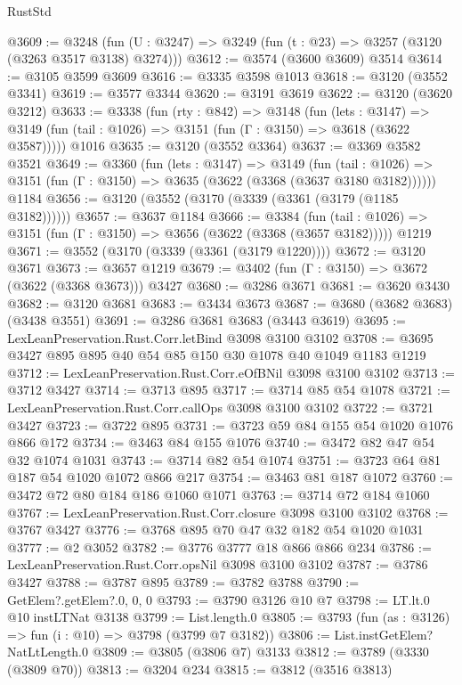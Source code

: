\begin{lexlean}{RustStd}
\begin{coremodule}
{\begin{coremodule}
{{{{{{{{{{{{{{{{{{{{{{{{{{@3609 := @3248 (fun (U : @3247) => @3249 (fun (t : @23) => @3257 (@3120 (@3263 @3517 @3138) @3274)))
@3612 := @3574 (@3600 @3609) @3514
@3614 := @3105 @3599 @3609
@3616 := @3335 @3598 @1013
@3618 := @3120 (@3552 @3341)
@3619 := @3577 @3344
@3620 := @3191 @3619
@3622 := @3120 (@3620 @3212)
@3633 := @3338
    (fun (rty : @842) =>
    @3148
      (fun (lets : @3147) =>
      @3149 (fun (tail : @1026) => @3151 (fun (Γ : @3150) => @3618 (@3622 @3587)))))
    @1016
@3635 := @3120 (@3552 @3364)
@3637 := @3369 @3582 @3521
@3649 := @3360
    (fun (lets : @3147) =>
    @3149
      (fun (tail : @1026) => @3151 (fun (Γ : @3150) => @3635 (@3622 (@3368 (@3637 @3180 @3182))))))
    @1184
@3656 := @3120 (@3552 (@3170 (@3339 (@3361 (@3179 (@1185 @3182))))))
@3657 := @3637 @1184
@3666 := @3384
    (fun (tail : @1026) => @3151 (fun (Γ : @3150) => @3656 (@3622 (@3368 (@3657 @3182)))))
    @1219
@3671 := @3552 (@3170 (@3339 (@3361 (@3179 @1220))))
@3672 := @3120 @3671
@3673 := @3657 @1219
@3679 := @3402 (fun (Γ : @3150) => @3672 (@3622 (@3368 @3673))) @3427
@3680 := @3286 @3671
@3681 := @3620 @3430
@3682 := @3120 @3681
@3683 := @3434 @3673
@3687 := @3680 (@3682 @3683) (@3438 @3551)
@3691 := @3286 @3681 @3683 (@3443 @3619)
@3695 := LexLeanPreservation.Rust.Corr.letBind @3098 @3100 @3102
@3708 := @3695 @3427 @895 @895 @40 @54 @85 @150 @30 @1078 @40 @1049 @1183 @1219
@3712 := LexLeanPreservation.Rust.Corr.eOfBNil @3098 @3100 @3102
@3713 := @3712 @3427
@3714 := @3713 @895
@3717 := @3714 @85 @54 @1078
@3721 := LexLeanPreservation.Rust.Corr.callOps @3098 @3100 @3102
@3722 := @3721 @3427
@3723 := @3722 @895
@3731 := @3723 @59 @84 @155 @54 @1020 @1076 @866 @172
@3734 := @3463 @84 @155 @1076
@3740 := @3472 @82 @47 @54 @32 @1074 @1031
@3743 := @3714 @82 @54 @1074
@3751 := @3723 @64 @81 @187 @54 @1020 @1072 @866 @217
@3754 := @3463 @81 @187 @1072
@3760 := @3472 @72 @80 @184 @186 @1060 @1071
@3763 := @3714 @72 @184 @1060
@3767 := LexLeanPreservation.Rust.Corr.closure @3098 @3100 @3102
@3768 := @3767 @3427
@3776 := @3768 @895 @70 @47 @32 @182 @54 @1020 @1031
@3777 := @2 @3052
@3782 := @3776 @3777 @18 @866 @866 @234
@3786 := LexLeanPreservation.Rust.Corr.opsNil @3098 @3100 @3102
@3787 := @3786 @3427
@3788 := @3787 @895
@3789 := @3782 @3788
@3790 := GetElem?.getElem?.{0, 0, 0}
@3793 := @3790 @3126 @10 @7
@3798 := LT.lt.{0} @10 instLTNat @3138
@3799 := List.length.{0}
@3805 := @3793 (fun (as : @3126) => fun (i : @10) => @3798 (@3799 @7 @3182))
@3806 := List.instGetElem?NatLtLength.{0}
@3809 := @3805 (@3806 @7) @3133
@3812 := @3789 (@3330 (@3809 @70))
@3813 := @3204 @234
@3815 := @3812 (@3516 @3813)
}}}}}}}}}}}}}}}}}}}}}}}}}}
\end{coremodule}}
\end{coremodule}
\end{lexlean}
